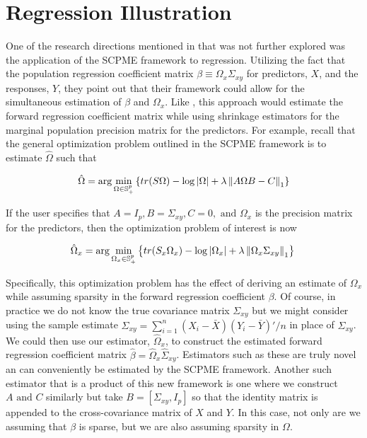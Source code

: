 \documentclass[11pt,]{report}
\theoremstyle{definition}
\theoremstyle{definition}
\theoremstyle{definition}
\theoremstyle{remark}
\begin{document}
\hypertarget{regression-illustration}{%
\section{Regression Illustration}\label{regression-illustration}}

One of the research directions mentioned in \citet{molstad2017shrinking} that was not further explored was the application of the SCPME framework to regression. Utilizing the fact that the population regression coefficient matrix \(\beta \equiv \Omega_{x}\Sigma_{xy}\) for predictors, \(X\), and the responses, \(Y\), they point out that their framework could allow for the simultaneous estimation of \(\beta\) and \(\Omega_{x}\). Like \citet{witten2009covariance}, this approach would estimate the forward regression coefficient matrix while using shrinkage estimators for the marginal population precision matrix for the predictors. For example, recall that the general optimization problem outlined in the SCPME framework is to estimate \(\hat{\Omega}\) such that

\begin{equation}
  \hat{\Omega} = \arg\min_{\Omega \in \mathbb{S}_{+}^{p}}\left\{ tr(S\Omega) - \log\left| \Omega \right| + \lambda\left\| A\Omega B - C \right\|_{1} \right\}
\label{eq:penloglik3}\notag
\end{equation}

If the user specifies that \(A = I_{p}, B = \Sigma_{xy}, C = 0, \mbox{ and } \Omega_{x}\) is the precision matrix for the predictors, then the optimization problem of interest is now

\begin{equation}
  \hat{\Omega}_{x} = \arg\min_{\Omega_{x} \in \mathbb{S}_{+}^{p}}\left\{ tr(S_{x}\Omega_{x}) - \log\left| \Omega_{x} \right| + \lambda\left\| \Omega_{x} \Sigma_{xy} \right\|_{1} \right\} \\
\label{eq:penloglik4}\notag
\end{equation}

Specifically, this optimization problem has the effect of deriving an estimate of \(\Omega_{x}\) while assuming sparsity in the forward regression coefficient \(\beta\). Of course, in practice we do not know the true covariance matrix \(\Sigma_{xy}\) but we might consider using the sample estimate \(\hat{\Sigma}_{xy} = \sum_{i = 1}^{n}\left(X_{i} - \bar{X}\right)\left(Y_{i} - \bar{Y}\right)'/n\) in place of \(\Sigma_{xy}\). We could then use our estimator, \(\hat{\Omega}_{x}\), to construct the estimated forward regression coefficient matrix \(\hat{\beta} = \hat{\Omega}_{x}\hat{\Sigma}_{xy}\). Estimators such as these are truly novel an can conveniently be estimated by the SCPME framework. Another such estimator that is a product of this new framework is one where we construct \(A \mbox{ and } C\) similarly but take \(B = \left[ \Sigma_{xy}, I_{p} \right]\) so that the identity matrix is appended to the cross-covariance matrix of \(X\) and \(Y\). In this case, not only are we assuming that \(\beta\) is sparse, but we are also assuming sparsity in \(\Omega\).
\end{document}
